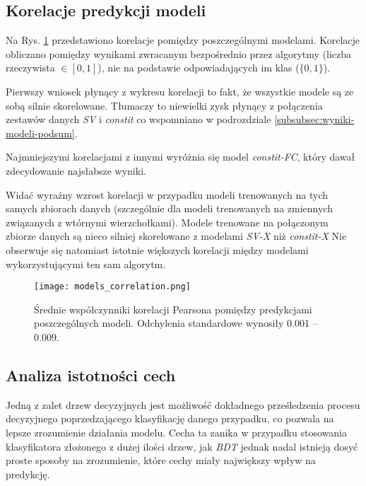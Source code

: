 \subsection{Korelacje predykcji modeli}

Na Rys. \ref{fig:models_corr} przedstawiono korelacje pomiędzy poszczególnymi modelami. Korelacje obliczano pomiędzy wynikami zwracanym bezpośrednio przez algorytmy (liczba rzeczywista $\in [0,1]$), nie na podstawie odpowiadających im klas ($\{0,1\}$).

Pierwszy wniosek płynący z wykresu korelacji to fakt, że wszystkie modele są ze sobą silnie skorelowane. Tłumaczy to niewielki zysk płynący z połączenia zestawów danych \textit{SV} i \textit{constit} co wspomniano w podrozdziale \ref{subsubsec:wyniki-modeli-podsum}.

Najmniejszymi korelacjami z innymi wyróżnia się model \textit{constit-FC}, który dawał zdecydowanie najsłabsze wyniki.

Widać wyraźny wzrost korelacji w przypadku modeli trenowanych na tych samych zbiorach danych (szczególnie dla modeli trenowanych na zmiennych związanych z wtórnymi wierzchołkami). 
Modele trenowane na połączonym zbiorze danych są nieco silniej skorelowane z modelami \textit{SV-X} niż \textit{constit-X}
Nie obserwuje się natomiast istotnie większych korelacji między modelami wykorzystującymi ten sam algorytm.

\begin{figure}[ht]
	\centering
	\texttt{[image: models\_correlation.png]}
	\caption{Średnie współczynniki korelacji Pearsona pomiędzy predykcjami poszczególnych modeli. Odchylenia standardowe wynosiły 0.001 -- 0.009.}
	\label{fig:models_corr}
\end{figure}

\FloatBarrier
\subsection{Analiza istotności cech}

Jedną z zalet drzew decyzyjnych jest możliwość dokładnego prześledzenia procesu decyzyjnego poprzedzającego klasyfikację danego przypadku, co pozwala na lepsze zrozumienie działania modelu. Cecha ta zanika w przypadku stosowania klasyfikatora złożonego z dużej ilości drzew, jak \textit{BDT} jednak nadal istnieją dosyć proste sposoby na zrozumienie, które cechy miały największy wpływ na predykcję.

